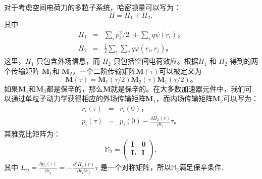 {对于考虑空间电荷力的多粒子系统，哈密顿量可以写为：
\begin{equation}
H={{H}_{1}}+{{H}_{2}},
\end{equation}
其中
\begin{eqnarray}
  {H}_{1} &=& \sum\limits_{i}{{p_{i}^{2}}/{2}\;}+\sum\limits_{i}{q\psi ({{r}_{i}})} \text{，} \\
  {H}_{2} &=& \frac{1}{2}\sum\limits_{i}{\sum\limits_{j}{q\varphi ({{r}_{i}},{{r}_{j}})}} \text{。}
\end{eqnarray}
这里，${{H}_{1}}$ 只包含外场信息，而 ${{H}_{2}}$ 只包括空间电荷效应。根据${{H}_{1}}$ 和 ${{H}_{2}}$ 得到的两个传输矩阵 ${\mathbf{M}_{1}}$和 ${{\mathbf{M}}_{2}}$，一个二阶传输矩阵$\mathbf{M}\left( \tau  \right)$可以被定义为
\begin{equation}
\mathbf{M}\left( \tau  \right)={\mathbf{M}_{1}}\left( \tau /2 \right){\mathbf{M}_{2}}\left( \tau  \right){\mathbf{M}_{1}}\left( \tau /2 \right) \text{。}
\end{equation}
如果$ {\mathbf{M}_{1}} $和$ {\mathbf{M}_{2}} $都是保辛的，那么$ \mathbf{M} $就是保辛的。在大多数加速器元件中，我们可以通过单粒子动力学获得相应的外场传输矩阵$ {\mathbf{M}_{1}} $，而内场传输矩阵$ {\mathbf{M} _ {2}} $可以写为：
\begin{eqnarray}
 {{r}_{i}}(\tau ) &=& {{r}_{i}}(0) \text{，} \\
 {{p}_{i}}(\tau ) &=& {{p}_{i}}(0)-\frac{\partial {{H}_{2}}(r)}{\partial {{r}_{i}}}\tau  \text{。}
\end{eqnarray}
其雅克比矩阵为：
\begin{equation}
{{\mathbb{M}}_{2}}=\left(
\begin{array}{cc}
   \mathbf{I} & \mathbf{0}  \\
   \mathbf{L} & \mathbf{I}  \\
\end{array} \right),
\end{equation}
其中
${{L}_{ij}}=\frac{\partial {{p}_{i}}(\tau )}{\partial {{r}_{j}}}=-\frac{{{\partial }^{2}}{{H}_{2}}(r)}{\partial {{r}_{i}}\partial {{r}_{j}}}\tau$
是一个对称矩阵，所以${{\mathbb{M}}_{2}}$满足保辛条件.

}
